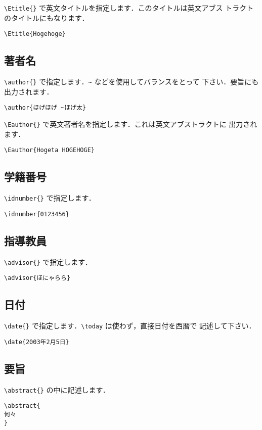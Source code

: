 \documentclass[mingoth]{kut-paper}		%
\begin{document}
  \verb|\Etitle{}| で英文タイトルを指定します．このタイトルは英文アブス
  トラクトのタイトルにもなります．
\begin{verbatim}
\Etitle{Hogehoge}
\end{verbatim}

  \subsection{著者名}
  \verb|\author{}| で指定します．\verb|~| などを使用してバランスをとって
  下さい．要旨にも出力されます．
\begin{verbatim}
\author{ほげほげ ~ほげ太}
\end{verbatim}

  \verb|\Eauthor{}| で英文著者名を指定します．これは英文アブストラクトに
  出力されます．
\begin{verbatim}
\Eauthor{Hogeta HOGEHOGE}
\end{verbatim}

  \subsection{学籍番号}
  \verb|\idnumber{}| で指定します．
\begin{verbatim}
\idnumber{0123456}
\end{verbatim}

  \subsection{指導教員}
  \verb|\advisor{}| で指定します．
\begin{verbatim}
\advisor{ほにゃらら}
\end{verbatim}

  \subsection{日付}
  \verb|\date{}| で指定します．\verb|\today| は使わず，直接日付を西暦で
  記述して下さい．
\begin{verbatim}
\date{2003年2月5日}
\end{verbatim}

  \subsection{要旨}
  \verb|\abstract{}| の中に記述します．
\begin{verbatim}
\abstract{
何々
}
\end{verbatim}
\end{document}
